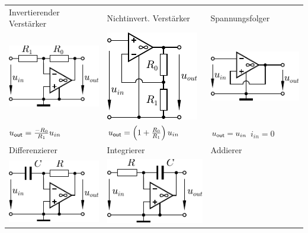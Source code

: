 \documentclass[fs, footer]{latex4ei}
\begin{document}
\begin{multicols*}{4}
{\begin{tabular}{lll}
	\end{tabular}
}


		\begin{tabular}{lll}
			Invertierender Verstärker & Nichtinvert. Verstärker & Spannungsfolger\\
			\includegraphics[scale = 0.9]{./img/invamp.pdf} & \includegraphics[scale = 0.9]{./img/notinvamp.pdf} & \includegraphics[scale = 0.9]{./img/voltagefollower.pdf}\\
			$u_{\sf out} = \frac{-R_0}{R_1} u_{in}$ & $u_{\sf out} = \left( 1+ \frac{R_0}{R_1} \right) u_{in}$ & $u_{\sf out} = u_{in}$ \quad $i_{in} = 0$\\[0.5em] \mrule
			Differenzierer & Integrierer & Addierer \\
			\includegraphics[scale = 0.9]{./img/differenzierer.pdf} & \includegraphics[scale = 0.9]{./img/integrierer.pdf} & \\

\end{tabular}
\end{multicols*}
\end{document}

